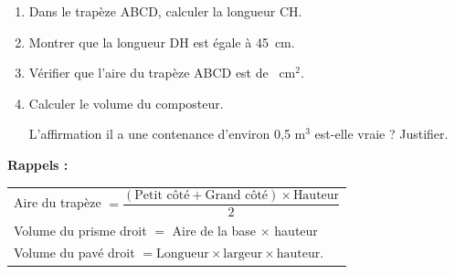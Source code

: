 \documentclass[exercice,a4]{thedocument}%
\begin{document}
\begin{enumerate}
	\begin{enumerate}
		\item Dans le trapèze ABCD, calculer la longueur CH.
		\item Montrer que la longueur DH est égale à 45~cm.
		\item Vérifier que l'aire du trapèze ABCD est de ~cm$^2$.
		\item Calculer le volume du composteur.

L'affirmation \og il a une contenance d'environ 0,5 m$^3$ \fg{} est-elle vraie ? Justifier.
	\end{enumerate}
\end{enumerate}
\medskip

\textbf{Rappels :}

\begin{tabularx}{\linewidth}{|X|}\hline
Aire du trapèze $ = \dfrac{(\text{Petit côté} + \text{Grand côté}) \times \text{Hauteur}}{2}$\rule[-3mm]{0mm}{9mm}\\
Volume du prisme droit $=$ Aire de la base $\times$  hauteur \\
Volume du pavé droit $= \text{Longueur} \times \text{largeur} \times  \text{hauteur}$.\\ \hline
\end{tabularx}

\showthesource
\end{document}
